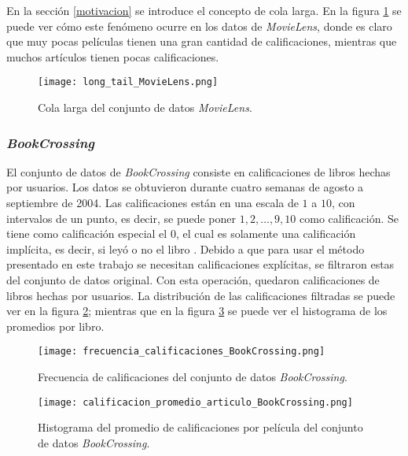 En la sección \ref{motivacion} se introduce el concepto de cola larga. En la figura \ref{fig:ML_long_tail} se puede ver cómo este fenómeno ocurre en los datos de \textit{MovieLens}, donde es claro que muy pocas películas tienen una gran cantidad de calificaciones, mientras que muchos artículos tienen pocas calificaciones.

\begin{figure}
	\centering
 	\texttt{[image: long\_tail\_MovieLens.png]}
 	\caption{Cola larga del conjunto de datos \textit{MovieLens}.}
 	\label{fig:ML_long_tail}
\end{figure}


\subsubsection{\textit{BookCrossing}}

El conjunto de datos de \textit{BookCrossing} consiste en  calificaciones de  libros hechas por  usuarios. Los datos se obtuvieron durante cuatro semanas de agosto a septiembre de 2004. Las calificaciones están en una escala de $1$ a $10$, con intervalos de un punto, es decir, se puede poner $1, 2, \hdots, 9, 10$ como calificación. Se tiene como calificación especial el $0$, el cual es solamente una calificación implícita, es decir, si leyó o no el libro \cite{ziegler2005improving}. Debido a que para usar el método presentado en este trabajo se necesitan calificaciones explícitas, se filtraron estas del conjunto de datos original. Con esta operación, quedaron  calificaciones de  libros hechas por  usuarios. La distribución de las calificaciones filtradas se puede ver en la figura \ref{fig:BC_frec_calificaciones}; mientras que en la figura \ref{fig:BC_hist_prom_cals} se puede ver el histograma de los promedios por libro.

\begin{figure}
	\centering
 	\texttt{[image: frecuencia\_calificaciones\_BookCrossing.png]}
 	\caption{Frecuencia de calificaciones del conjunto de datos \textit{BookCrossing}.}
 	\label{fig:BC_frec_calificaciones}
\end{figure}

\begin{figure}
	\centering
 	\texttt{[image: calificacion\_promedio\_articulo\_BookCrossing.png]}
 	\caption{Histograma del promedio de calificaciones por película del conjunto de datos \textit{BookCrossing}.}
 	\label{fig:BC_hist_prom_cals}
\end{figure}

